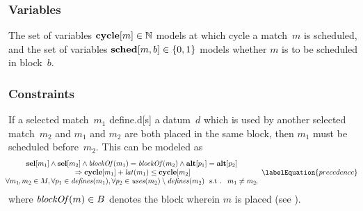 \subsubsection{Variables}

The set of \glspl{variable} \mbox{$\mVar{cycle}[m] \in \mNatNumSet$} models at
which cycle a \gls{match}~$m$ is scheduled, and the set of \glspl{variable}
\mbox{$\mVar{sched}[m, b] \in \mSet{0, 1}$} models whether $m$ is to be
scheduled in \gls{block}~$b$\hspace{-1pt}.


\subsubsection{Constraints}

If a selected \gls{match}~$m_1$ \gls{define.d}[s] a \gls{datum}~$d$ which is
used by another selected \gls{match}~$m_2$ and $m_1$ and $m_2$ are both placed
in the same \gls{block}, then $m_1$ must be scheduled before~$m_2$.
%
This can be modeled as
%
\begin{equation}
  \hspace*{-1em}
  \begin{array}{c}
    \mVar{sel}[m_1] \mAnd \mVar{sel}[m_2]
    \mAnd \mBlockOf(m_1) = \mBlockOf(m_2)
    \mAnd \mVar{alt}[p_1] = \mVar{alt}[p_2] \\
    \mbox{} \mImp
    \mVar{cycle}[m_1] + \mLat(m_1) \leq \mVar{cycle}[m_2] \\
    \forall m_1 \hspace{-1pt}, m_2 \in \mMatchSet,
    \forall p_1 \in \mDefines(m_1),
    \forall p_2 \in \mUses(m_2) \setminus \mDefines(m_2)
    \text{ \st }
    m_1 \neq m_2 \hspace{-.8pt},
  \end{array}
  \labelEquation{precedence}
\end{equation}
%
where \mbox{$\operatorname{\textrm{\textit{blockOf}}}(m) \in B$} denotes the block wherein $m$ is
placed (see ).

